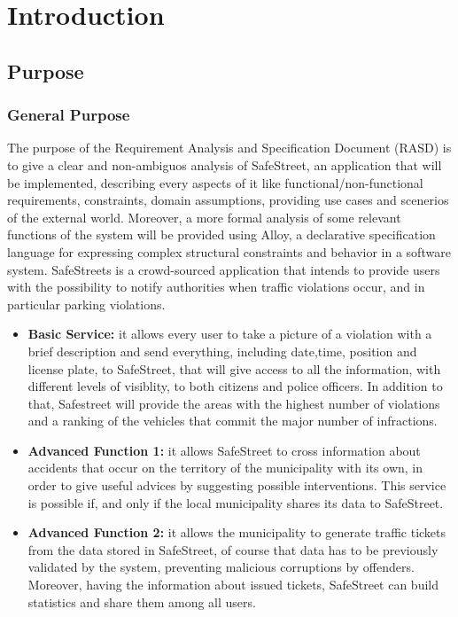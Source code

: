 \documentclass[a4paper, hidelinks, 12pt]{report}
\begin{document}
	\chapter{Introduction}\label{ch:introduction}
	\section{Purpose}\label{sec:purpose}
	\subsection{General Purpose}\label{subsec:general-purpose}
		The purpose of the Requirement Analysis and Specification Document (RASD) is to give a clear and non-ambiguos analysis of SafeStreet, an application that will be implemented, describing every aspects of it like functional/non-functional requirements, constraints, domain assumptions, providing use cases and scenerios of the external world. Moreover, a more formal analysis of some relevant functions of the system will be provided using Alloy, a declarative specification language for expressing complex structural constraints and behavior in a software system.
		SafeStreets is a crowd-sourced application that intends to provide users with the possibility to notify authorities when traffic violations occur, and in particular parking violations.
		\begin{itemize}
			\item \textbf{Basic Service:}
			it allows every user to take a picture of a violation with a brief description and send everything, including date,time, position and license plate, to SafeStreet, that will give access to all the information, with different levels of visiblity, to both citizens and police officers. In addition to that, Safestreet will provide the areas with the highest number of violations and a ranking of the vehicles that commit the major number of infractions.
			\item \textbf{Advanced Function 1:}
			it allows SafeStreet to cross information about accidents that occur on the territory of the municipality with its own, in order to give useful advices by suggesting possible interventions. This service is possible if, and only if the local municipality shares its data to SafeStreet.
			\item \textbf{Advanced Function 2:}
			it allows the municipality to generate traffic tickets from the data stored in SafeStreet, of course that data has to be previously validated by the system, preventing malicious corruptions by offenders. Moreover, having the information about issued tickets, SafeStreet can build statistics and share them among all users.
		\end{itemize}
\end{document}
